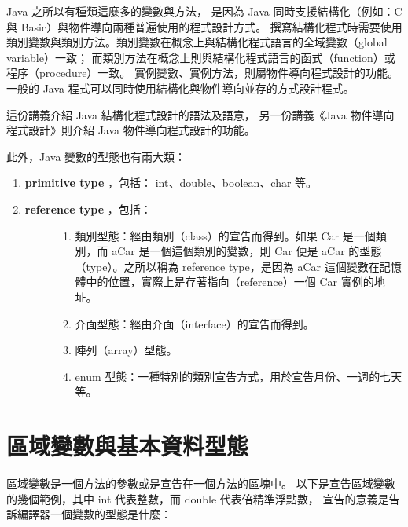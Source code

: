 \documentclass[a4paper,12pt,english]{sphinxmanual}
\begin{document}
Java 之所以有種類這麼多的變數與方法，
是因為 Java 同時支援結構化（例如：C 與 Basic）與物件導向兩種普遍使用的程式設計方式。
撰寫結構化程式時需要使用類別變數與類別方法。類別變數在概念上與結構化程式語言的全域變數（global variable）一致；
而類別方法在概念上則與結構化程式語言的函式（function）或程序（procedure）一致。
實例變數、實例方法，則屬物件導向程式設計的功能。一般的 Java 程式可以同時使用結構化與物件導向並存的方式設計程式。

這份講義介紹 Java 結構化程式設計的語法及語意，
另一份講義《Java 物件導向程式設計》則介紹 Java 物件導向程式設計的功能。

此外，Java 變數的型態也有兩大類：
\begin{enumerate}
\item {} 
\textbf{primitive type} ，包括： \href{http://download-llnw.oracle.com/javase/tutorial/java/nutsandbolts/datatypes.html}{int、double、boolean、char} 等。

\item {} \begin{description}
\item[{\textbf{reference type} ，包括：}] \leavevmode\begin{enumerate}
\item {} 
類別型態：經由類別（class）的宣告而得到。如果 Car 是一個類別，而 aCar 是一個這個類別的變數，則 Car 便是 aCar 的型態（type）。之所以稱為 reference type，是因為 aCar 這個變數在記憶體中的位置，實際上是存著指向（reference）一個 Car 實例的地址。

\item {} 
介面型態：經由介面（interface）的宣告而得到。

\item {} 
陣列（array）型態。

\item {} 
enum 型態：一種特別的類別宣告方式，用於宣告月份、一週的七天等。

\end{enumerate}

\end{description}

\end{enumerate}


\chapter{區域變數與基本資料型態}
\label{java_vartype::doc}\label{java_vartype:id1}
區域變數是一個方法的參數或是宣告在一個方法的區塊中。
以下是宣告區域變數的幾個範例，其中 int 代表整數，而 double 代表倍精準浮點數，
宣告的意義是告訴編譯器一個變數的型態是什麼：
\end{document}
